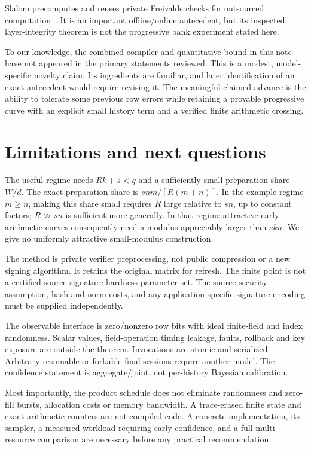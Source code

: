 \documentclass[11pt,letterpaper]{article}
\theoremstyle{definition}
\begin{document}
Slalom precomputes and reuses private Freivalds checks for outsourced computation~\cite{slalom}. It is an important offline/online antecedent, but its inspected layer-integrity theorem is not the progressive bank experiment stated here.

To our knowledge, the combined compiler and quantitative bound in this note have not appeared in the primary statements reviewed. This is a modest, model-specific novelty claim. Its ingredients are familiar, and later identification of an exact antecedent would require revising it. The meaningful claimed advance is the ability to tolerate some previous row errors while retaining a provable progressive curve with an explicit small history term and a verified finite arithmetic crossing.

\section{Limitations and next questions}
The useful regime needs $Rk+s<q$ and a sufficiently small preparation share $W/d$. The exact preparation share is $snm/[R(m+n)]$. In the example regime $m\ge n$, making this share small requires $R$ large relative to $sn$, up to constant factors; $R\gg sn$ is sufficient more generally. In that regime attractive early arithmetic curves consequently need a modulus appreciably larger than $skn$. We give no uniformly attractive small-modulus construction.

The method is private verifier preprocessing, not public compression or a new signing algorithm. It retains the original matrix for refresh. The finite point is not a certified source-signature hardness parameter set. The source security assumption, hash and norm costs, and any application-specific signature encoding must be supplied independently.

The observable interface is zero/nonzero row bits with ideal finite-field and index randomness. Scalar values, field-operation timing leakage, faults, rollback and key exposure are outside the theorem. Invocations are atomic and serialized. Arbitrary resumable or forkable final sessions require another model. The confidence statement is aggregate/joint, not per-history Bayesian calibration.

Most importantly, the product schedule does not eliminate randomness and zero-fill bursts, allocation costs or memory bandwidth. A trace-erased finite state and exact arithmetic counters are not compiled code. A concrete implementation, its sampler, a measured workload requiring early confidence, and a full multi-resource comparison are necessary before any practical recommendation.
\end{document}
